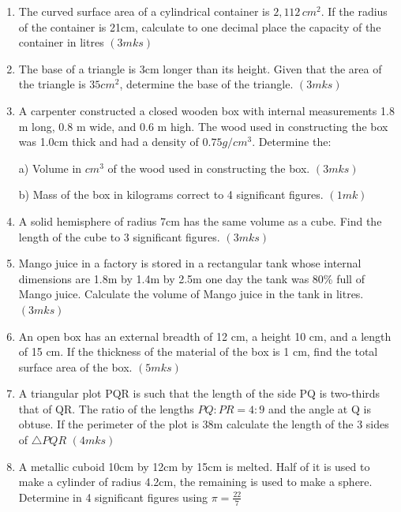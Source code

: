 \documentclass[
  a4paperpaper,
]{scrbook}
\begin{document}
\begin{tcolorbox}
\begin{enumerate}
\def\labelenumi{\arabic{enumi}.}
\setcounter{enumi}{4}
\item
  The curved surface area of a cylindrical container is \(2,112\,cm^2\).
  If the radius of the container is 21cm, calculate to one decimal place
  the capacity of the container in litres \hspace{2.1 cm} \((3mks)\)
\item
  The base of a triangle is 3cm longer than its height. Given that the
  area of the triangle is \(35cm^2\), determine the base of the
  triangle. \hspace{7.2 cm} \((3mks)\)
\item
  A carpenter constructed a closed wooden box with internal measurements
  1.8 m long, 0.8 m wide, and 0.6 m high. The wood used in constructing
  the box was 1.0cm thick and had a density of \(0.75g/cm^{3}\).
  Determine the:

  a) Volume in \(cm^3\) of the wood used in constructing the box.
  \hspace{4.2 cm} \((3mks)\)

  b) Mass of the box in kilograms correct to 4 significant figures.
  \hspace{3.6 cm} \((1mk)\)
\item
  A solid hemisphere of radius 7cm has the same volume as a cube. Find
  the length of the cube to 3 significant figures. \hspace{10.4 cm}
  \((3mks)\)
\item
  Mango juice in a factory is stored in a rectangular tank whose
  internal dimensions are 1.8m by 1.4m by 2.5m one day the tank was 80\%
  full of Mango juice. Calculate the volume of Mango juice in the tank
  in litres. \hspace{10 cm} \((3mks)\)
\item
  An open box has an external breadth of 12 cm, a height 10 cm, and a
  length of 15 cm. If the thickness of the material of the box is 1 cm,
  find the total surface area of the box. \hspace{3.7cm} \((5mks)\)
\item
  A triangular plot PQR is such that the length of the side PQ is
  two-thirds that of QR. The ratio of the lengths \(PQ: PR = 4:9\) and
  the angle at Q is obtuse. If the perimeter of the plot is 38m
  calculate the length of the 3 sides of \(\triangle PQR\)
  \hspace{7.5cm} \((4mks)\)
\item
  A metallic cuboid 10cm by 12cm by 15cm is melted. Half of it is used
  to make a cylinder of radius 4.2cm, the remaining is used to make a
  sphere. Determine in 4 significant figures using \(\pi= \frac{22}{7}\)


\end{enumerate}
\end{tcolorbox}
\end{document}
